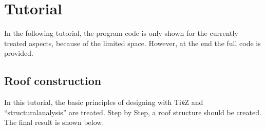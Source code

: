 \documentclass[%
  a4paper,
  BCOR20mm,
  pointlessnumbers,
  twoside,
  halfparskip,
  openright,
]{scrreprt}
\newcommand{\tikzsym}{Ti\emph{k}Z }
\begin{document}
\endgroup


\chapter{Tutorial}
\label{sec:Tutorial}

In the following tutorial, the program code is only shown for the currently treated aspects, because of the limited space. However, at the end the full code is provided.

\section{Roof construction}
\label{sec:Dachkonsturktion}

In this tutorial, the basic principles of designing with \tikzsym and ``structuralanalysis'' are treated. Step by Step, a roof structure should be created. The final result is shown below.

\end{document}
